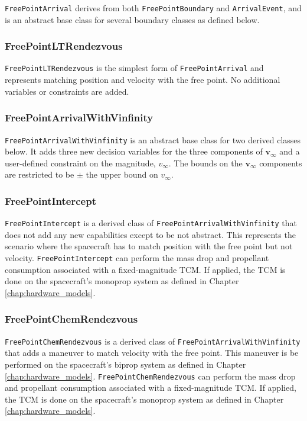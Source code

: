 \texttt{FreePointArrival} derives from both \texttt{FreePointBoundary} and \texttt{ArrivalEvent}, and is an abstract base class for several boundary classes as defined below.

\subsubsection{FreePointLTRendezvous}
\label{subsubsec:FreePointLTRendezvous}

\texttt{FreePointLTRendezvous} is the simplest form of \texttt{FreePointArrival} and represents matching position and velocity with the free point. No additional variables or constraints are added.

\subsubsection{FreePointArrivalWithVinfinity}
\label{subsubsec:FreePointArrivalWithVinfinity}

\texttt{FreePointArrivalWithVinfinity} is an abstract base class for two derived classes below. It adds three new decision variables for the three components of $\mathbf{v}_\infty$ and a user-defined constraint on the magnitude, $v_\infty$. The bounds on the $\mathbf{v}_\infty$ components are restricted to be $\pm$ the upper bound on $v_\infty$.

\subsubsection{FreePointIntercept}
\label{subsubsec:FreePointIntercept}

\texttt{FreePointIntercept} is a derived class of \texttt{FreePointArrivalWithVinfinity} that does not add any new capabilities except to be not abstract. This represents the scenario where the spacecraft has to match position with the free point but not velocity. \texttt{FreePointIntercept} can perform the mass drop and propellant consumption associated with a fixed-magnitude TCM. If applied, the TCM is done on the spacecraft's monoprop system as defined in Chapter \ref{chap:hardware_models}.

\subsubsection{FreePointChemRendezvous}
\label{subsubsec:FreePointChemRendezvous}

\texttt{FreePointChemRendezvous} is a derived class of \texttt{FreePointArrivalWithVinfinity} that adds a maneuver to match velocity with the free point. This maneuver is be performed on the spacecraft's biprop system as defined in Chapter \ref{chap:hardware_models}. \texttt{FreePointChemRendezvous} can perform the mass drop and propellant consumption associated with a fixed-magnitude TCM. If applied, the TCM is done on the spacecraft's monoprop system as defined in Chapter \ref{chap:hardware_models}.

